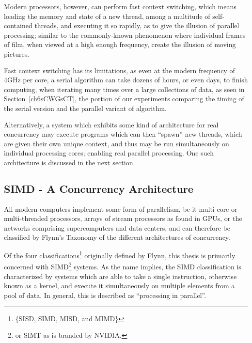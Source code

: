Modern processors, however, can perform fast context switching, which means loading the memory and state of a new thread, among a multitude of self-contained threads, and executing it so rapidly, as to give the illusion of parallel processing; similar to the commonly-known phenomenon where individual frames of film, when viewed at a high enough frequency, create the illusion of moving pictures.

Fast context switching has its limitations, as even at the modern frequency of 4GHz per core, a serial algorithm can take dozens of hours, or even days, to finish computing, when iterating many times over a large collections of data, as seen in Section~\ref{ch6sCWGsCT}, the portion of our experiments comparing the timing of the serial version and the parallel variant of  algorithm.

Alternatively, a system which exhibits some kind of architecture for real concurrency may execute programs which can then ``spawn'' new threads, which are given their own unique context, and thus may be run simultaneously on individual processing cores; enabling real parallel processing. One such architecture is discussed in the next section.

%
%
%
%
\subsection{SIMD - A Concurrency Architecture}
\label{ch2sPPssSACA}
All modern computers implement some form of parallelism, be it multi-core or multi-threaded processors, arrays of stream processors as found in GPUs, or the networks comprising supercomputers and data centers, and can therefore be classified by Flynn's Taxonomy of the different architectures of concurrency.

Of the four classifications\footnote{\{SISD, SIMD, MISD, and MIMD\}} originally defined by Flynn, this thesis is primarily concerned with \gls{SIMD}\footnote{or SIMT as is branded by NVIDIA.} systems. As the name implies, the \gls{SIMD} classification is characterized by systems which are able to take a single instruction, otherwise known as a kernel, and execute it simultaneously on multiple elements from a pool of data. In general, this is described as ``processing in parallel''.

